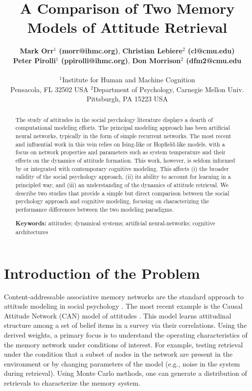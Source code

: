 \documentclass[10pt,letterpaper]{article}
\title{A Comparison of Two Memory Models of Attitude Retrieval}
\author{
{\large \bf Mark Orr$^{1}$ (morr@ihmc.org)},   {\large \bf Christian Lebiere$^{2}$ (cl@cmu.edu)}  \\
{\large \bf Peter Pirolli$^{1}$ (ppirolli@ihmc.org)}, {\large \bf Don Morrison$^{2}$ (dfm2@cmu.edu} \\
\\
  $^1$Institute for Human and Machine Cognition \\
  Pensacola, FL 32502 USA
  \AND
  $^2$Department of Psychology, Carnegie Mellon Univ.  \\
  Pittsburgh, PA 15223 USA
  }
\begin{document}
\maketitle

\begin{abstract}
The study of attitudes in the social psychology literature displays a dearth of computational modeling efforts. The principal modeling approach has been artificial neural networks, typically in the form of simple recurrent networks. The most recent and influential work in this vein relies on Ising-like or Hopfield-like models, with a focus on network properties and parameters such as system temperature and their effects on the dynamics of attitude formation.  This work, however, is seldom informed by or integrated with contemporary cognitive modeling. This affects (i) the broader validity of the social psychology approach, (ii) its ability to account for learning in a principled way, and (iii) an understanding of the dynamics of attitude retrieval. We describe two studies that provide a simple but direct comparison between the social psychology approach and cognitive modeling, focusing on characterizing the performance differences between the two modeling paradigms. 

\textbf{Keywords:} 
attitudes; dynamical systems; artificial neural-networks; cognitive architectures
\end{abstract}


\section{Introduction of the Problem}
Content-addressable associative memory networks are the standard approach to attitude modeling in social psychology \citep{OrrThrushPlaut2013,van2005connectionist,MonroeRead2008}. The most recent example is the Causal Attitude Network (CAN) model of attitudes \citep{dalege2016,DalegeBorsboom_2018}.  This model learns attitudinal structure among a set of belief items in a survey via their correlations. Using the derived weights, a primary focus is to understand the operating characteristics of the memory network under conditions of interest. For example, testing retrieval under the condition that a subset of nodes in the network are present in the environment or by changing parameters of the model (e.g., noise in the system during retrieval).  Using Monte Carlo methods, one can generate a distribution of retrievals to characterize the memory system.
\end{document}
